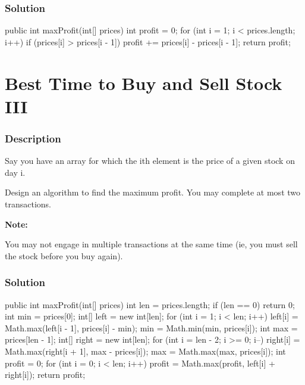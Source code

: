 \subsubsection{Solution}

\begin{Code}
public int maxProfit(int[] prices) {
    int profit = 0;
    for (int i = 1; i < prices.length; i++) {
        if (prices[i] > prices[i - 1]) {
            profit += prices[i] - prices[i - 1];
        }
    }
    return profit;
}
\end{Code}

\newpage

\section{Best Time to Buy and Sell Stock III} %

\subsubsection{Description}
Say you have an array for which the ith element is the price of a given stock on day i.

Design an algorithm to find the maximum profit. You may complete at most two transactions.

\textbf{Note:}

You may not engage in multiple transactions at the same time (ie, you must sell the stock before you buy again).

\subsubsection{Solution}

\begin{Code}
public int maxProfit(int[] prices) {
    int len = prices.length;
    if (len == 0) {
        return 0;
    }
    int min = prices[0];
    int[] left = new int[len];
    for (int i = 1; i < len; i++) {
        left[i] = Math.max(left[i - 1], prices[i] - min);
        min = Math.min(min, prices[i]);
    }
    int max = prices[len - 1];
    int[] right = new int[len];
    for (int i = len - 2; i >= 0; i--) {
        right[i] = Math.max(right[i + 1], max - prices[i]);
        max = Math.max(max, prices[i]);
    }
    int profit = 0;
    for (int i = 0; i < len; i++) {
        profit = Math.max(profit, left[i] + right[i]);
    }
    return profit;
}
\end{Code}


